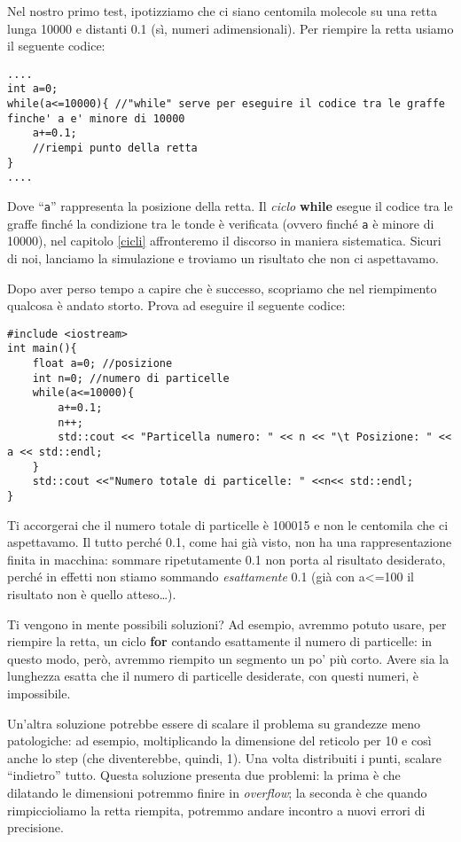	Nel nostro primo test, ipotizziamo che ci siano centomila molecole su una retta lunga 10000 e distanti 0.1 (sì, numeri adimensionali). Per riempire la retta usiamo il seguente codice:
	\begin{lstlisting}
....
int a=0;
while(a<=10000){ //"while" serve per eseguire il codice tra le graffe finche' a e' minore di 10000
	a+=0.1;
	//riempi punto della retta
}
....
	\end{lstlisting}
	Dove ``\verb|a|'' rappresenta la posizione della retta. Il \emph{ciclo} \textbf{while} esegue il codice tra le graffe finché la condizione tra le tonde è verificata (ovvero finché \verb|a| è minore di 10000), nel capitolo \ref{cicli} affronteremo il discorso in maniera sistematica. Sicuri di noi, lanciamo la simulazione e troviamo un risultato che non ci aspettavamo. 
	
	Dopo aver perso tempo a capire che è successo, scopriamo che nel riempimento qualcosa è andato storto. Prova ad eseguire il seguente codice:
	\begin{lstlisting}
#include <iostream>
int main(){
	float a=0; //posizione
	int n=0; //numero di particelle
	while(a<=10000){
		a+=0.1;
		n++;
		std::cout << "Particella numero: " << n << "\t Posizione: " << a << std::endl;
	}
	std::cout <<"Numero totale di particelle: " <<n<< std::endl;
}	
	\end{lstlisting}
	Ti accorgerai che il numero totale di particelle è 100015 e non le centomila che ci aspettavamo. Il tutto perché 0.1, come hai già visto, non ha una rappresentazione finita in macchina: sommare ripetutamente 0.1 non porta al risultato desiderato, perché in effetti non stiamo sommando \emph{esattamente} 0.1 (già con a<=100 il risultato non è quello atteso\ldots).
	
	Ti vengono in mente possibili soluzioni? Ad esempio, avremmo potuto usare, per riempire la retta, un ciclo \textbf{for} contando esattamente il numero di particelle: in questo modo, però, avremmo riempito un segmento un po' più corto. Avere sia la lunghezza esatta che il numero di particelle desiderate, con questi numeri, è impossibile.
	
	Un'altra soluzione potrebbe essere di scalare il problema su grandezze meno patologiche: ad esempio, moltiplicando la dimensione del reticolo per 10 e così anche lo step (che diventerebbe, quindi, 1). Una volta distribuiti i punti, scalare ``indietro'' tutto. Questa soluzione presenta due problemi: la prima è che dilatando le dimensioni potremmo finire in \emph{overflow}; la seconda è che quando rimpiccioliamo la retta riempita, potremmo andare incontro a nuovi errori di precisione.\\
	
